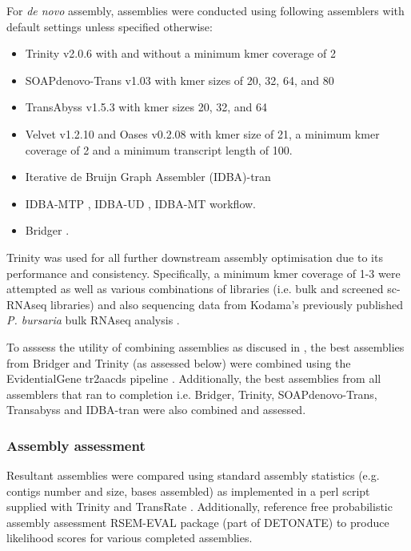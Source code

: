 For \textit{de novo} assembly, assemblies were conducted using following 
assemblers with default settings unless specified otherwise:
\begin{itemize}
    \item Trinity v2.0.6 \citep{Grabherr2011} with and without a minimum kmer coverage of 2
    \item SOAPdenovo-Trans v1.03 \citep{Xie2014} with kmer sizes of 20, 32, 64, and 80   
    \item TransAbyss v1.5.3 \citep{Robertson2010} with kmer sizes 20, 32, and 64 
    \item Velvet v1.2.10 \citep{Zerbino2008} and Oases v0.2.08 \citep{Schulz2012} with kmer size of 
        21, a minimum kmer coverage of 2 and a minimum transcript length
        of 100.
    \item Iterative de Bruijn Graph Assembler (IDBA)-tran \citep{Peng2010,Peng2012,Peng2013} 
    \item IDBA-MTP \citep{Leung2014}, IDBA-UD \citep{Peng2012}, IDBA-MT \citep{Leung2013} workflow.
    \item Bridger \citep{Chang2015}.
\end{itemize}

Trinity was used for all further downstream assembly optimisation due to its performance
and consistency.
Specifically, a minimum kmer coverage of 1-3 were attempted as well as various
combinations of libraries (i.e. bulk and screened sc-RNAseq libraries) and also
sequencing data from Kodama's previously published \textit{P. bursaria} bulk
RNAseq analysis \citep{Kodama2014c}.


To asssess the utility of combining assemblies as discused in \citep{Nakasugi2014}, 
the best assemblies from Bridger and Trinity
(as assessed below) were combined using the EvidentialGene tr2aacds pipeline \citep{Gilbert2013}.
Additionally, the best assemblies from all assemblers that ran to completion i.e.
Bridger, Trinity, SOAPdenovo-Trans, Transabyss and IDBA-tran were also combined and 
assessed. 

\subsubsection{Assembly assessment}

Resultant assemblies were compared using standard assembly statistics 
(e.g. contigs number and size, bases assembled) as implemented in a perl script supplied with 
Trinity \citep{Haas2013} and TransRate \citep{Smith-unna2015}. 
Additionally, reference free probabilistic assembly assessment RSEM-EVAL package (part of DETONATE) \citep{Li2014} to
produce likelihood scores for various completed assemblies.

